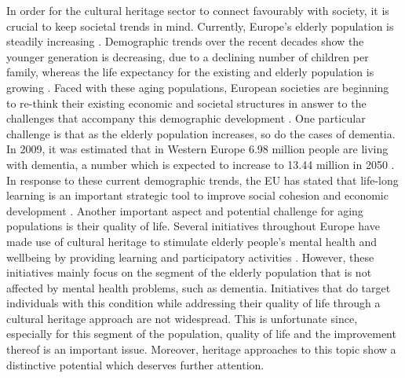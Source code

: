 In order for the cultural heritage sector 
to connect favourably with society, it is crucial to keep societal trends in mind. 
Currently, Europe’s elderly population is steadily increasing \parencite[8]{Grut_2013}.
Demographic trends over the recent decades show the younger generation is decreasing, 
due to a declining number of children per family, whereas the life expectancy for the 
existing and elderly population is growing \parencite[8]{Grut_2013}. 
Faced with these aging populations, European societies are beginning to re-think 
their existing economic and societal structures in answer to the challenges that 
accompany this demographic development \parencite[9]{Grut_2013}. 
One particular challenge is that as the elderly population increases, so do the cases 
of dementia. In 2009, it was estimated that in Western Europe 6.98 million people are 
living with dementia, a number which is expected to increase to 13.44 million in 2050 \parencite[8]{International_2009}. 		
In response to these current demographic trends, the EU has stated that life-long 
learning is an important strategic tool to improve social cohesion and economic 
development \parencite[12]{Commission_2010}. Another important aspect and potential 
challenge for aging populations is their quality of life. Several initiatives 
throughout Europe have made use of cultural heritage to stimulate elderly people’s 
mental health and wellbeing by providing learning and participatory activities \parencite[8]{Grut_2013}. 
However, these initiatives mainly focus on the segment of 
the elderly population that is not affected by mental health problems, such as dementia.
 Initiatives that do target individuals with this condition while addressing their quality 
of life through a cultural heritage approach are not widespread. 
This is unfortunate since, especially for this segment of the population, quality of life 
and the improvement thereof is an important issue. Moreover, heritage approaches to 
this topic show a distinctive potential which deserves further attention.		
		
	

